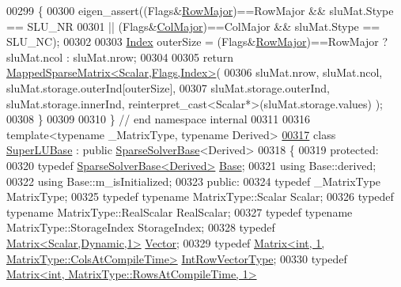 \begin{DoxyCode}
00299 \{
00300   eigen\_assert((Flags&\hyperlink{group__enums_ggaacded1a18ae58b0f554751f6cdf9eb13acfcde9cd8677c5f7caf6bd603666aae3}{RowMajor})==RowMajor && sluMat.Stype == SLU\_NR
00301          || (Flags&\hyperlink{group__enums_ggaacded1a18ae58b0f554751f6cdf9eb13a0cbd4bdd0abcfc0224c5fcb5e4f6669a}{ColMajor})==ColMajor && sluMat.Stype == SLU\_NC);
00302 
00303   \hyperlink{namespace_eigen_a62e77e0933482dafde8fe197d9a2cfde}{Index} outerSize = (Flags&\hyperlink{group__enums_ggaacded1a18ae58b0f554751f6cdf9eb13acfcde9cd8677c5f7caf6bd603666aae3}{RowMajor})==RowMajor ? sluMat.ncol : sluMat.nrow;
00304 
00305   \textcolor{keywordflow}{return} \hyperlink{class_eigen_1_1_mapped_sparse_matrix}{MappedSparseMatrix<Scalar,Flags,Index>}(
00306     sluMat.nrow, sluMat.ncol, sluMat.storage.outerInd[outerSize],
00307     sluMat.storage.outerInd, sluMat.storage.innerInd, reinterpret\_cast<Scalar*>(sluMat.storage.values) );
00308 \}
00309 
00310 \} \textcolor{comment}{// end namespace internal}
00311 
00316 \textcolor{keyword}{template}<\textcolor{keyword}{typename} \_MatrixType, \textcolor{keyword}{typename} Derived>
\hyperlink{class_eigen_1_1_super_l_u_base}{00317} \textcolor{keyword}{class }\hyperlink{class_eigen_1_1_super_l_u_base}{SuperLUBase} : \textcolor{keyword}{public} \hyperlink{group___sparse_core___module_class_eigen_1_1_sparse_solver_base}{SparseSolverBase}<Derived>
00318 \{
00319   \textcolor{keyword}{protected}:
00320     \textcolor{keyword}{typedef} \hyperlink{group___sparse_core___module_class_eigen_1_1_sparse_solver_base}{SparseSolverBase<Derived>} \hyperlink{group___sparse_core___module_class_eigen_1_1_sparse_solver_base}{Base};
00321     \textcolor{keyword}{using} Base::derived;
00322     \textcolor{keyword}{using} Base::m\_isInitialized;
00323   \textcolor{keyword}{public}:
00324     \textcolor{keyword}{typedef} \_MatrixType MatrixType;
00325     \textcolor{keyword}{typedef} \textcolor{keyword}{typename} MatrixType::Scalar Scalar;
00326     \textcolor{keyword}{typedef} \textcolor{keyword}{typename} MatrixType::RealScalar RealScalar;
00327     \textcolor{keyword}{typedef} \textcolor{keyword}{typename} MatrixType::StorageIndex StorageIndex;
00328     \textcolor{keyword}{typedef} \hyperlink{group___core___module}{Matrix<Scalar,Dynamic,1>} \hyperlink{group___core___module}{Vector};
00329     \textcolor{keyword}{typedef} \hyperlink{group___core___module}{Matrix<int, 1, MatrixType::ColsAtCompileTime>} 
      \hyperlink{group___core___module}{IntRowVectorType};
00330     \textcolor{keyword}{typedef} \hyperlink{group___core___module}{Matrix<int, MatrixType::RowsAtCompileTime, 1>} 

\end{DoxyCode}
